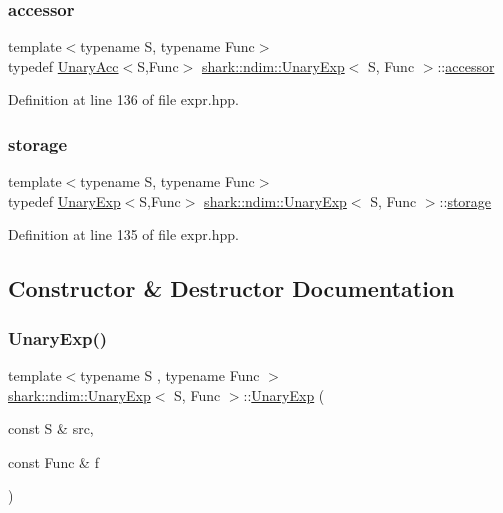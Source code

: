 \subsubsection{\texorpdfstring{accessor}{accessor}}
{\footnotesize\ttfamily template$<$typename S, typename Func$>$ \\
typedef \hyperlink{classshark_1_1ndim_1_1_unary_acc}{Unary\+Acc}$<$S,Func$>$ \hyperlink{classshark_1_1ndim_1_1_unary_exp}{shark\+::ndim\+::\+Unary\+Exp}$<$ S, Func $>$\+::\hyperlink{classshark_1_1ndim_1_1_unary_exp_aa34e1f563bfcee209cd2c1886fe7320f}{accessor}}



Definition at line 136 of file expr.\+hpp.

\hypertarget{classshark_1_1ndim_1_1_unary_exp_aff41674c204a5df02b79b518efa8ea5b}{}\label{classshark_1_1ndim_1_1_unary_exp_aff41674c204a5df02b79b518efa8ea5b} 
\subsubsection{\texorpdfstring{storage}{storage}}
{\footnotesize\ttfamily template$<$typename S, typename Func$>$ \\
typedef \hyperlink{classshark_1_1ndim_1_1_unary_exp}{Unary\+Exp}$<$S,Func$>$ \hyperlink{classshark_1_1ndim_1_1_unary_exp}{shark\+::ndim\+::\+Unary\+Exp}$<$ S, Func $>$\+::\hyperlink{classshark_1_1ndim_1_1_unary_exp_aff41674c204a5df02b79b518efa8ea5b}{storage}}



Definition at line 135 of file expr.\+hpp.



\subsection{Constructor \& Destructor Documentation}
\hypertarget{classshark_1_1ndim_1_1_unary_exp_a5b4b3528aa72c169b82dbd699ddbdf5f}{}\label{classshark_1_1ndim_1_1_unary_exp_a5b4b3528aa72c169b82dbd699ddbdf5f} 
\subsubsection{\texorpdfstring{Unary\+Exp()}{UnaryExp()}}
{\footnotesize\ttfamily template$<$typename S , typename Func $>$ \\
\hyperlink{classshark_1_1ndim_1_1_unary_exp}{shark\+::ndim\+::\+Unary\+Exp}$<$ S, Func $>$\+::\hyperlink{classshark_1_1ndim_1_1_unary_exp}{Unary\+Exp} (\begin{DoxyParamCaption}\item[{const S \&}]{src,  }\item[{const Func \&}]{f }\end{DoxyParamCaption})}



